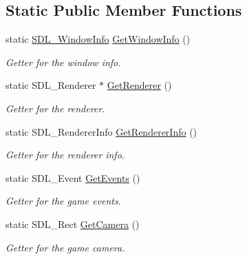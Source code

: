 \subsection*{Static Public Member Functions}
\begin{DoxyCompactItemize}
\item 
\mbox{\label{classGame_aa626467d3a202d2eca952c972fd2e0bf}} 
static \hyperlink{structSDL__WindowInfo}{S\+D\+L\+\_\+\+Window\+Info} \hyperlink{classGame_aa626467d3a202d2eca952c972fd2e0bf}{Get\+Window\+Info} ()
\begin{DoxyCompactList}\small\item\em Getter for the window info. \end{DoxyCompactList}\item 
\mbox{\label{classGame_a258a5c5dc8fcb42562ce22338f355e7d}} 
static S\+D\+L\+\_\+\+Renderer $\ast$ \hyperlink{classGame_a258a5c5dc8fcb42562ce22338f355e7d}{Get\+Renderer} ()
\begin{DoxyCompactList}\small\item\em Getter for the renderer. \end{DoxyCompactList}\item 
\mbox{\label{classGame_a40692522c413451781d0fa2ecf7ca91a}} 
static S\+D\+L\+\_\+\+Renderer\+Info \hyperlink{classGame_a40692522c413451781d0fa2ecf7ca91a}{Get\+Renderer\+Info} ()
\begin{DoxyCompactList}\small\item\em Getter for the renderer info. \end{DoxyCompactList}\item 
\mbox{\label{classGame_a7ea06dbc77dccebed1e9a7acd4966d7b}} 
static S\+D\+L\+\_\+\+Event \hyperlink{classGame_a7ea06dbc77dccebed1e9a7acd4966d7b}{Get\+Events} ()
\begin{DoxyCompactList}\small\item\em Getter for the game events. \end{DoxyCompactList}\item 
\mbox{\label{classGame_a4c2d2d2e8b4477c6addc2741047e399b}} 
static S\+D\+L\+\_\+\+Rect \hyperlink{classGame_a4c2d2d2e8b4477c6addc2741047e399b}{Get\+Camera} ()
\begin{DoxyCompactList}\small\item\em Getter for the game camera. \end{DoxyCompactList}\end{DoxyCompactItemize}



